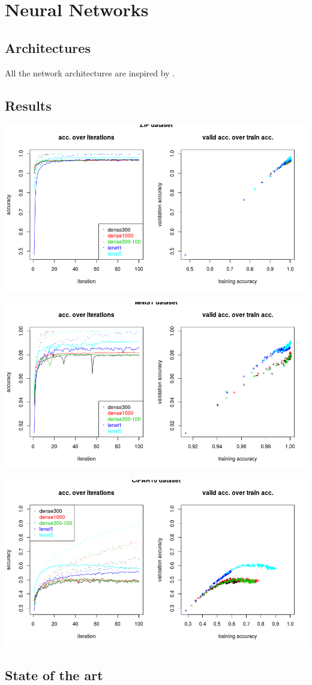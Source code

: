 
\section{Neural Networks}

\subsection{Architectures}

All the network architectures are inspired by \cite{lecun98}.

\subsection{Results}

\includegraphics[width=\textwidth]{../plots/nn_zip}

\includegraphics[width=\textwidth]{../plots/nn_mnist}

\includegraphics[width=\textwidth]{../plots/nn_cifar10}

\subsection{State of the art}